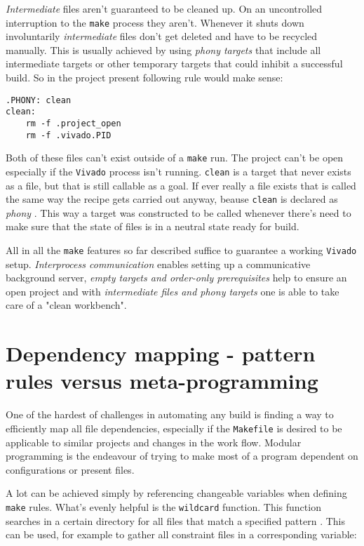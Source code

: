 \textit{Intermediate} files aren't guaranteed to be cleaned up. On an uncontrolled interruption to the \texttt{make} process they aren't. Whenever it shuts down involuntarily \textit{intermediate} files don't get deleted and have to be recycled manually. This is usually achieved by using \textit{phony targets} that include all intermediate targets or other temporary targets that could inhibit a successful build. So in the project present following rule would make sense:
\begin{lstlisting}[language={[gnu] make}]
.PHONY: clean
clean:
	rm -f .project_open
	rm -f .vivado.PID
\end{lstlisting}
\noindent
Both of these files can't exist outside of a \texttt{make} run. The project can't be open especially if the \texttt{Vivado} process isn't running. \texttt{clean} is a target that never exists as a file, but that is still callable as a goal. If ever really a file exists that is called the same way the recipe gets carried out anyway, beause \texttt{clean} is declared as \textit{phony} \cite[see][p. 29]{Make16}. This way a target was constructed to be called whenever there's need to make sure that the state of files is in a neutral state ready for build.

All in all the \texttt{make} features so far described suffice to guarantee a working \texttt{Vivado} setup. \textit{Interprocess communication} enables setting up a communicative background server, \textit{empty targets and order-only prerequisites} help to ensure an open project and with \textit{intermediate files and phony targets} one is able to take care of a "clean workbench". 

\section{Dependency mapping - pattern rules versus meta-programming}

One of the hardest of challenges in automating any build is finding a way to efficiently map all file dependencies, especially if the \texttt{Makefile} is desired to be applicable to similar projects and changes in the work flow. Modular programming is the endeavour of trying to make most of a program dependent on configurations or present files.

A lot can be achieved simply by referencing changeable variables when defining \texttt{make} rules. What's evenly helpful is the \texttt{wildcard} function. This function searches in a certain directory for all files that match a specified pattern \cite[p. 89]{Make16}. This can be used, for example to gather all constraint files in a corresponding variable:

